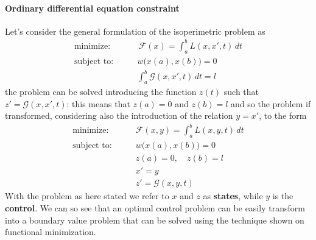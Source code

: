 	\paragraph{Ordinary differential equation constraint} Let's consider the general formulation of the isoperimetric problem as
	\begin{align*}
		\textrm{minimize:} \qquad & \, \mathcal F(x) = \int_a^b  L (x,x',t)\, dt \\
		\textrm{subject to:}\qquad & w\big(x(a),x(b) \big)= 0 \\
		& \int_a^b \mathcal G(x,x',t)\,dt = l
	\end{align*}
	the problem can be solved introducing the function $z(t)$ such that $z' = \mathcal G(x,x',t)$: this means that $z(a) = 0$ and $z(b) = l$ and so the problem if transformed, considering also the introduction of the relation $y = x'$, to the form
	\begin{align*}
		\textrm{minimize:} \qquad & \mathcal F(x,y) = \int_a^b  L (x,y,t)\, dt \\
		\textrm{subject to:}\qquad & w\big(x(a),x(b) \big)= 0 \\
		& z(a) = 0,\quad z(b) = l \\ & x' = y \\ & z' = \mathcal G(x,y,t)
	\end{align*}
	With the problem as here stated we refer to $x$ and $z$ as \textbf{states}, while $y$ is the \textbf{control}. We can so see that an optimal control problem can be easily transform into a boundary value problem that can be solved using the technique shown on functional minimization.
	 
